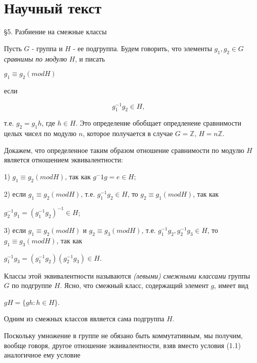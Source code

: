 \section{Научный текст} 
\begin{center}
\S5. Разбиение на смежные классы
\end{center}

Пусть $G$ - группа и $H$ - ее подгруппа. Будем говорить, что элементы $g_1,g_2 \in G$ \emph{сравнимы по модулю} $H$, и писать

\begin{center}
$g_1 \equiv g_2 (mod H)$            
\end{center}

\noindent если

\begin{equation}
g_1^{-1} g_2 \in H,
\end{equation}

\noindent т.е. $g_2 = g_1 h$, где $h \in H$. Это определение обобщает опредленеие сравнимости целых чисел по модулю $n$, которое получается в случае $G = \mathbb{Z}$, $H = n\mathbb{Z}$.
\par Докажем, что определенное таким образом отношение сравнимости по модулю $H$ является отношением эквивалентности:
\par 1) $g_1 \equiv g_2 (mod H)$, так как $g^-1 g = e \in H $;
\par 2) если $g_1 \equiv g_2 (mod H)$, т.е. $g_1^{-1} g_2 \in H$, то $g_2 \equiv g_1 (mod H)$, так как

\begin{center}
$g_2^{-1} g_1 = (g_1^{-1} g_2)^{-1} \in H$;
\end{center}

\par 3) если $g_1 \equiv g_2 (mod H)$ и $g_2 \equiv g_3 (mod H)$, т.е. $g_1^{-1} g_2, g_2^{-1} g_3 \in H$, то $g_1 \equiv g_3 (mod H)$, так как

\begin{center}
$g_1^{-1} g_3 = (g_1^{-1} g_2)(g_2^{-1} g_3) \in H$.            
\end{center}

Классы этой эквивалентности называются \emph{(левыми) смежными классами} группы $G$ по подгруппе $H$. Ясно, что смежный класс, содержащий элемент $g$, имеет вид

\begin{center}
$gH = \{gh: h \in H\}$.            
\end{center}

\noindent Одним из смежных классов является сама подгруппа $H$.
\par Поскольку умножение в группе не обязано быть коммутативным, мы получим, вообще говоря, другое отношение эквивалентности, взяв вместо условия (1.1) аналогичное ему условие

